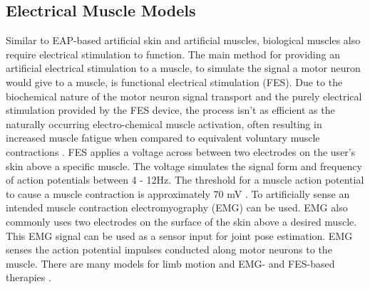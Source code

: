 

\subsection{Electrical Muscle Models}
Similar to EAP-based artificial skin and artificial muscles, biological muscles also require electrical stimulation to function. The main method for providing an artificial electrical stimulation to a muscle, to simulate the signal a motor neuron would give to a muscle, is functional electrical stimulation (FES). Due to the biochemical nature of the motor neuron signal transport and the purely electrical stimulation provided by the FES device, the process isn't as efficient as the naturally occurring electro-chemical muscle activation, often resulting in increased muscle fatigue when compared to equivalent voluntary muscle contractions \citep{Ibitoye2016}. FES applies a voltage across between two electrodes on the user's skin above a specific muscle. The voltage simulates the signal form and frequency of action potentials between 4 - 12Hz\citep{Popovic2004}. The threshold for a muscle action potential to cause a muscle contraction is approximately 70 mV \cite{Schmidt-Nielsen2002}.
To artificially sense an intended muscle contraction electromyography (EMG) can be used. EMG also commonly uses two electrodes on the surface of the skin above a desired muscle. This EMG signal can be used as a sensor input for joint pose estimation. EMG senses the action potential impulses conducted along motor neurons to the muscle. 
There are many models for limb motion and EMG- and FES-based therapies \cite{Meadmore2014,Freeman2015,Hodkin2018,Popovic2014}.




